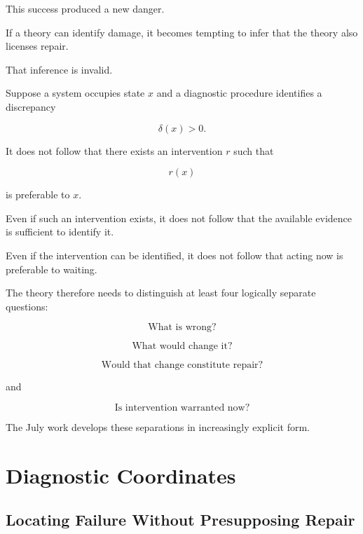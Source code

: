 \documentclass[11pt]{article}
\theoremstyle{remark}
\begin{document}
This success produced a new danger.

If a theory can identify damage, it becomes tempting to infer that the theory also licenses repair.

That inference is invalid.

Suppose a system occupies state $x$ and a diagnostic procedure identifies a discrepancy

\begin{equation}
\delta(x)>0.
\end{equation}

It does not follow that there exists an intervention $r$ such that

\begin{equation}
r(x)
\end{equation}

is preferable to $x$.

Even if such an intervention exists, it does not follow that the available evidence is sufficient to identify it.

Even if the intervention can be identified, it does not follow that acting now is preferable to waiting.

The theory therefore needs to distinguish at least four logically separate questions:

\begin{equation}
\text{What is wrong?}
\end{equation}

\begin{equation}
\text{What would change it?}
\end{equation}

\begin{equation}
\text{Would that change constitute repair?}
\end{equation}

and

\begin{equation}
\text{Is intervention warranted now?}
\end{equation}

The July work develops these separations in increasingly explicit form.

\section{Diagnostic Coordinates}

\subsection{Locating Failure Without Presupposing Repair}
\end{document}
